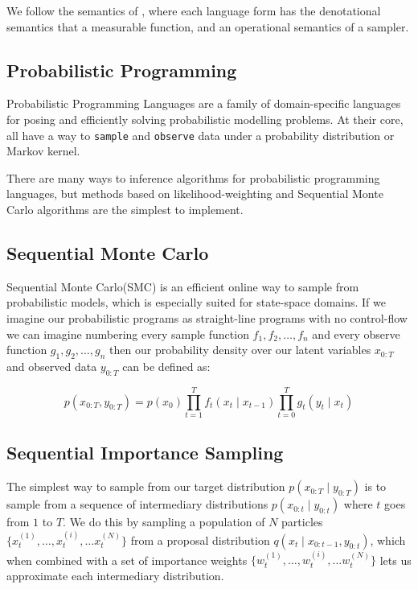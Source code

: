 \documentclass[
]{ceurart}
\begin{document}
We follow the semantics of \cite{staton2016semantics}, where each
language form has the denotational semantics that a
measurable function, and an operational semantics of a sampler.

\subsection{Probabilistic Programming}

Probabilistic Programming Languages\cite{wood2014new,
  van2018introduction} are a family of domain-specific languages for
posing and efficiently solving probabilistic modelling problems. At
their core, all have a way to \texttt{sample} and \texttt{observe}
data under a probability distribution or Markov kernel.

There are many ways to inference algorithms for probabilistic
programming languages, but methods based on likelihood-weighting and
Sequential Monte Carlo algorithms are the simplest to implement.

\subsection{Sequential Monte Carlo}

Sequential Monte Carlo\cite{chopin2020introduction}(SMC) is an efficient
online way to sample from probabilistic models, which is especially suited for
state-space domains. If we imagine our probabilistic programs as
straight-line programs with no control-flow we can imagine numbering
every sample function $f_1, f_2, \ldots, f_n$ and every observe
function $g_1, g_2, \ldots, g_n$ then our probability density over our
latent variables $x_{0:T}$ and observed data $y_{0:T}$ can be defined as:

\begin{equation}
  p(x_{0:T}, y_{0:T}) = p(x_0)\prod_{t=1}^T f_t(x_t \mid x_{t-1})\prod_{t=0}^T g_t(y_t \mid x_t)
\end{equation}

\subsection{Sequential Importance Sampling}

The simplest way to sample from our target distribution $p(x_{0:T}
\mid y_{0:T})$ is to sample from a sequence of intermediary
distributions $p(x_{0:t} \mid y_{0:t})$ where $t$ goes from $1$ to
$T$. We do this by sampling a population of $N$ particles
$\{x^{(1)}_t, \ldots, x^{(i)}_t, \ldots x^{(N)}_t\}$ from a proposal
distribution $q(x_t \mid x_{0:t-1}, y_{0:t})$, which when combined
with a set of importance weights $\{w^{(1)}_t, \ldots, w^{(i)}_t,
\ldots w^{(N)}_t\}$ lets us approximate each intermediary
distribution.
\end{document}
